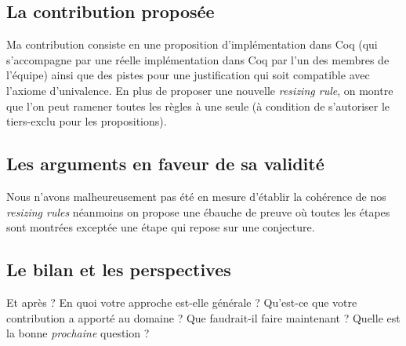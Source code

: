 \documentclass[11pt]{article}
\begin{document}
\subsection*{La contribution proposée}

Ma contribution consiste en une proposition d'implémentation dans Coq
(qui s'accompagne par une réelle implémentation dans Coq par l'un des membres
de l'équipe) ainsi que des pistes pour une justification qui soit compatible
avec l'axiome d'univalence. En plus de proposer une nouvelle \emph{resizing
rule}, on montre que l'on peut ramener toutes les règles à une seule (à
condition de s'autoriser le tiers-exclu pour les propositions).

\subsection*{Les arguments en faveur de sa validité}

Nous n'avons malheureusement pas été en mesure d'établir la cohérence de nos
\emph{resizing rules} néanmoins on propose une ébauche de preuve où toutes les
étapes sont montrées exceptée une étape qui repose sur une conjecture.

\subsection*{Le bilan et les perspectives}

Et après ? En quoi votre approche est-elle générale ?
Qu'est-ce que votre contribution a apporté au domaine ?
Que faudrait-il faire maintenant ?
Quelle est la bonne \emph{prochaine} question ?
\end{document}
